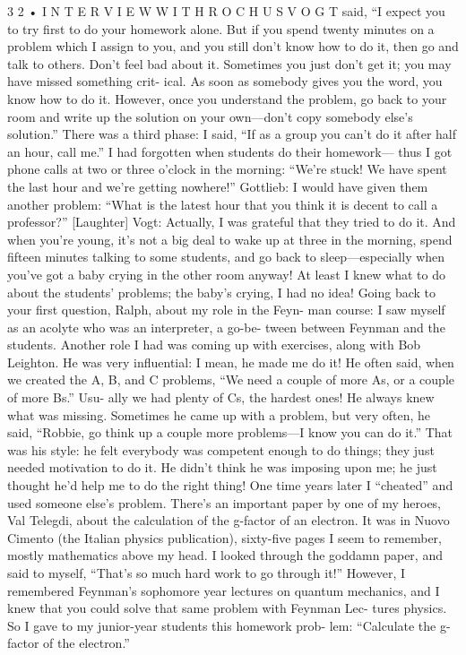 \documentclass[11pt,oneside]{article}
\begin{document}
3 2 • I N T E R V I E W  W I T H  R O C H U S  V O G T said, “I expect you to try first to do your homework alone. But if you spend twenty minutes on a problem which I assign to you, and you still don’t know how to do it, then go and talk to others. Don’t feel bad about it. Sometimes you just don’t get it; you may have missed something crit- ical. As soon as somebody gives you the word, you know how to do it. However, once you understand the problem, go back to your room and write up the solution on your own---don’t copy somebody else’s solution.” There was a third phase: I said, “If as a group you can’t do it after half an hour, call me.” I had forgotten when students do their homework--- thus I got phone calls at two or three o’clock in the morning: “We’re stuck! We have spent the last hour and we’re getting nowhere!” Gottlieb: I would have given them another problem: “What is the latest hour that you think it is decent to call a professor?” [Laughter] Vogt: Actually, I was grateful that they tried to do it. And when you’re young, it’s not a big deal to wake up at three in the morning, spend fifteen minutes talking to some students, and go back to sleep---especially when you’ve got a baby crying in the other room anyway! At least I knew what to do about the students’ problems; the baby’s crying, I had no idea! Going back to your first question, Ralph, about my role in the Feyn- man course: I saw myself as an acolyte who was an interpreter, a go-be- tween between Feynman and the students. Another role I had was coming up with exercises, along with Bob Leighton. He was very influential: I mean, he made me do it! He often said, when we created the A, B, and C problems, “We need a couple of more As, or a couple of more Bs.” Usu- ally we had plenty of Cs, the hardest ones! He always knew what was missing. Sometimes he came up with a problem, but very often, he said, “Robbie, go think up a couple more problems---I know you can do it.” That was his style: he felt everybody was competent enough to do things; they just needed motivation to do it. He didn’t think he was imposing upon me; he just thought he’d help me to do the right thing! One time years later I “cheated” and used someone else’s problem. There’s an important paper by one of my heroes, Val Telegdi, about the calculation of the g-factor of an electron. It was in Nuovo Cimento (the Italian physics publication), sixty-five pages I seem to remember, mostly mathematics above my head. I looked through the goddamn paper, and said to myself, “That’s so much hard work to go through it!” However, I remembered Feynman’s sophomore year lectures on quantum mechanics, and I knew that you could solve that same problem with Feynman Lec- tures physics. So I gave to my junior-year students this homework prob- lem: “Calculate the g-factor of the electron.”\par
\end{document}
